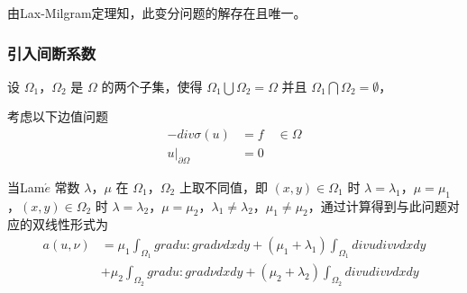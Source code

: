 \documentclass[a4paper,UTF8,titlepage]{ctexart}
\begin{document}
由Lax-Milgram定理知，此变分问题的解存在且唯一。




%
%	
%	

\subsubsection{引入间断系数}

设 $\Omega_1$，$\Omega_2$ 是 $\Omega$ 的两个子集，使得 $\Omega_1 \bigcup \Omega_2 = \Omega$ 并且 $\Omega_1 \bigcap \Omega_2 = \emptyset$，

考虑以下边值问题
\begin{equation}
\begin{aligned}
	-div \sigma(u) &= f \quad \in \Omega \\
	u |_{\partial \Omega} &= 0
\end{aligned}
\end{equation}

当Lam$\acute{e}$ 常数 $\lambda$，$\mu$ 在 $\Omega_1$，$\Omega_2$ 上取不同值，即 $(x,y) \in \Omega_1$ 时 $\lambda = \lambda_1$，$\mu = \mu_1$，$(x,y) \in \Omega_2$ 时 $\lambda = \lambda_2$，$\mu = \mu_2$，$\lambda_1 \ne \lambda_2$，$\mu_1 \ne \mu_2$，通过计算得到与此问题对应的双线性形式为
\begin{equation}
\begin{aligned}
	a(u,\nu) &= \mu_1 \int_{\Omega_1} grad u : grad \nu dxdy + (\mu_1 +\lambda_1) \int_{\Omega_1} div u div \nu  dxdy \\
	&+ \mu_2 \int_{\Omega_2} grad u : grad \nu dxdy + (\mu_2 +\lambda_2) \int_{\Omega_2} div u div \nu  dxdy
\end{aligned}
\end{equation}
\end{document}
